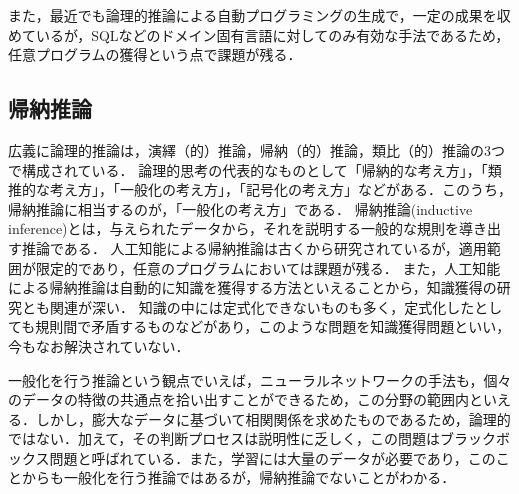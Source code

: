 \documentclass[exploratorypaper]{jsaiart} %
\begin{document}
また，最近でも論理的推論による自動プログラミングの生成で，一定の成果を収めているが\cite{palsql}，SQLなどのドメイン固有言語に対してのみ有効な手法であるため，任意プログラムの獲得という点で課題が残る．

\subsection{帰納推論}
広義に論理的推論は，演繹（的）推論，帰納（的）推論，類比（的）推論の3つで構成されている\cite{math300}．
論理的思考の代表的なものとして「帰納的な考え方」，「類推的な考え方」，「一般化の考え方」，「記号化の考え方」などがある\cite{saito:11}．このうち，帰納推論に相当するのが，「一般化の考え方」である．
帰納推論(inductive inference)とは，与えられたデータから，それを説明する一般的な規則を導き出す推論である\cite{帰納推論}．
人工知能による帰納推論は古くから研究されているが\cite{CASE1983193}\cite{4767034}，適用範囲が限定的であり，任意のプログラムにおいては課題が残る．
また，人工知能による帰納推論は自動的に知識を獲得する方法といえることから，知識獲得の研究とも関連が深い．
知識の中には定式化できないものも多く，定式化したとしても規則間で矛盾するものなどがあり，このような問題を知識獲得問題といい\cite{KnowledgeAI}\cite{KAIssues}，今もなお解決されていない．

一般化を行う推論という観点でいえば，ニューラルネットワークの手法も，個々のデータの特徴の共通点を拾い出すことができるため，この分野の範囲内といえる．しかし，膨大なデータに基づいて相関関係を求めたものであるため，論理的ではない．加えて，その判断プロセスは説明性に乏しく，この問題はブラックボックス問題と呼ばれている\cite{BlackBoxProblem}．また，学習には大量のデータが必要であり，このことからも一般化を行う推論ではあるが，帰納推論でないことがわかる．
\end{document}
